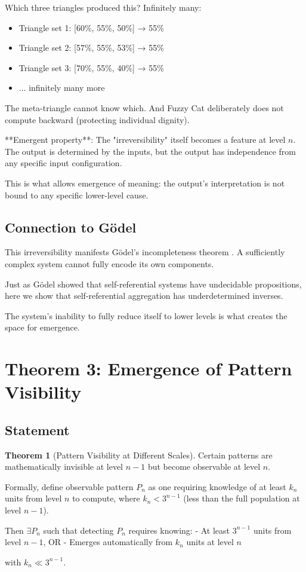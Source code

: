 \documentclass[12pt,a4paper]{article}
\theoremstyle{definition}
\newtheorem{theorem}{Theorem}[section]
\begin{document}
Which three triangles produced this? Infinitely many:

\begin{itemize}
    \item Triangle set 1: [60\%, 55\%, 50\%] → 55\%
    \item Triangle set 2: [57\%, 55\%, 53\%] → 55\%
    \item Triangle set 3: [70\%, 55\%, 40\%] → 55\%
    \item ... infinitely many more
\end{itemize}

The meta-triangle cannot know which. And Fuzzy Cat deliberately does not compute backward (protecting individual dignity).

**Emergent property**: The "irreversibility" itself becomes a feature at level $n$. The output is determined by the inputs, but the output has independence from any specific input configuration.

This is what allows emergence of meaning: the output's interpretation is not bound to any specific lower-level cause.

\subsection{Connection to Gödel}

This irreversibility manifests Gödel's incompleteness theorem \citep{godel1931}. A sufficiently complex system cannot fully encode its own components.

Just as Gödel showed that self-referential systems have undecidable propositions, here we show that self-referential aggregation has underdetermined inverses.

The system's inability to fully reduce itself to lower levels is what creates the space for emergence.

\section{Theorem 3: Emergence of Pattern Visibility}

\subsection{Statement}

\begin{theorem}[Pattern Visibility at Different Scales]
Certain patterns are mathematically invisible at level $n-1$ but become observable at level $n$.

Formally, define observable pattern $P_n$ as one requiring knowledge of at least $k_n$ units from level $n$ to compute, where $k_n < 3^{n-1}$ (less than the full population at level $n-1$).

Then $\exists P_n$ such that detecting $P_n$ requires knowing:
- At least $3^{n-1}$ units from level $n-1$, OR
- Emerges automatically from $k_n$ units at level $n$

with $k_n \ll 3^{n-1}$.
\end{theorem}
\end{document}
